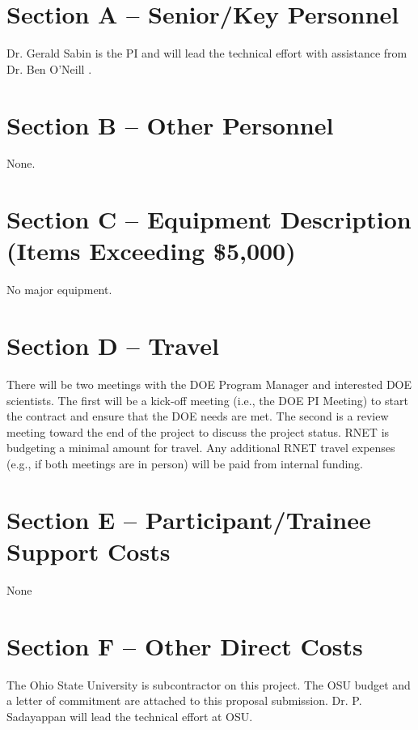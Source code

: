 

\section{Section A -- Senior/Key Personnel}
Dr. Gerald Sabin is the PI and will lead the technical effort with
assistance from Dr. Ben O'Neill . 

\section{Section B -- Other Personnel}
None.

\section{Section C -- Equipment Description (Items Exceeding \$5,000)}
No major equipment.

\section{Section D -- Travel}
There will be two meetings with the DOE Program Manager and interested
DOE scientists. The first will be a kick-off meeting (i.e., the DOE PI
Meeting) to start the contract and ensure that the DOE needs are
met. The second is a review meeting toward the end of the project to
discuss the project status.  RNET is budgeting a minimal amount for
travel. Any additional RNET travel expenses (e.g., if both meetings
are in person) will be paid from internal funding.

\section{Section E -- Participant/Trainee Support Costs}
None
  
\section{Section F -- Other Direct Costs}
The Ohio State University is subcontractor on this project. The OSU budget
and a letter of commitment are attached to this proposal submission. Dr. P. Sadayappan will lead the technical effort at OSU. 


